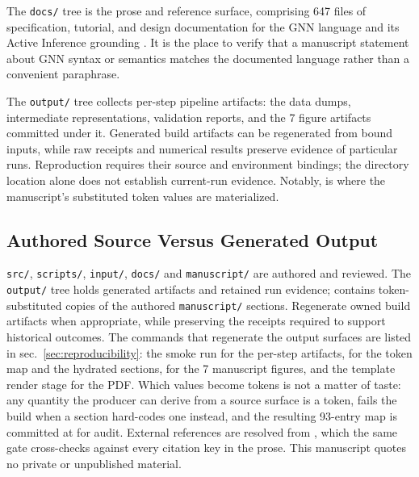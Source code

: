 \documentclass[
  english,
  9pt,
]{extarticle}
\begin{document}
The \texttt{docs/} tree is the prose and reference surface, comprising
647 files of specification, tutorial, and design documentation for the
GNN language and its Active Inference grounding \citep{gnn2023}. It is
the place to verify that a manuscript statement about GNN syntax or
semantics matches the documented language rather than a convenient
paraphrase.

The \texttt{output/} tree collects per-step pipeline artifacts: the data
dumps, intermediate representations, validation reports, and the 7
figure artifacts committed under it. Generated build artifacts can be
regenerated from bound inputs, while raw receipts and numerical results
preserve evidence of particular runs. Reproduction requires their source
and environment bindings; the directory location alone does not
establish current-run evidence. Notably,
 is where the
manuscript's substituted token values are materialized.

\subsection{Authored Source Versus Generated
Output}\label{authored-source-versus-generated-output}

\texttt{src/}, \texttt{scripts/}, \texttt{input/}, \texttt{docs/} and
\texttt{manuscript/} are authored and reviewed. The \texttt{output/}
tree holds generated artifacts and retained run evidence;
 contains token-substituted copies of the
authored \texttt{manuscript/} sections. Regenerate owned build artifacts
when appropriate, while preserving the receipts required to support
historical outcomes. The commands that regenerate the output surfaces
are listed in sec.~\ref{sec:reproducibility}: the smoke run for the
per-step artifacts,
 for the token map
and the hydrated sections, 
for the 7 manuscript figures, and the template render stage for the PDF.
Which values become tokens is not a matter of taste: any quantity the
producer can derive from a source surface is a token,
 fails the build when a
section hard-codes one instead, and the resulting 93-entry map is
committed at  for audit.
External references are resolved from
, which the same gate cross-checks
against every citation key in the prose. This manuscript quotes no
private or unpublished material.
\end{document}
